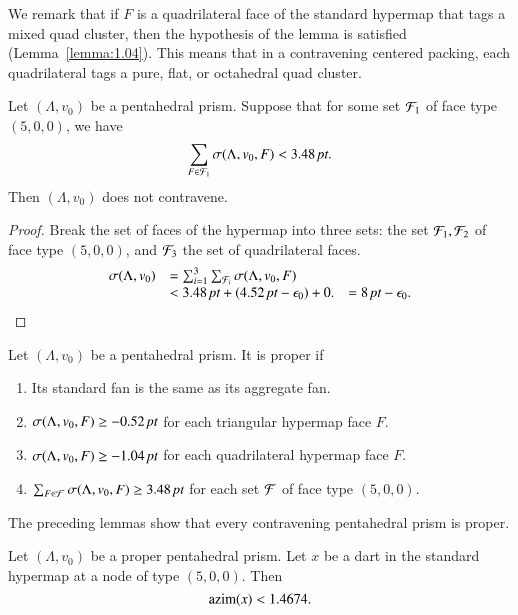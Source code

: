We remark that if $F$ is a quadrilateral face of the standard hypermap
that tags a mixed quad cluster, then the hypothesis of the lemma
is satisfied (Lemma~\ref{lemma:1.04}).  This means that in a contravening
centered packing, each quadrilateral tags a pure, flat, or octahedral
quad cluster.


\begin{lemma}
Let $(\Lambda,v_0)$ be a pentahedral prism.  Suppose that for some 
set ${\mathcal F}_1$ of face type $(5,0,0)$,  we have
  $$
  \sum_{F\in{\mathcal F}_1}\sigma(\Lambda,v_0,F) < 3.48\,\hbox{\it pt}.
  $$
Then $(\Lambda,v_0)$ does not contravene.
\end{lemma}

\begin{proof}
Break the set of faces of the hypermap into three sets:
the set ${\mathcal F}_1,{\mathcal F}_2$ of face type $(5,0,0)$, and ${\mathcal F}_3$ the set
of quadrilateral faces.
  $$
  \begin{array}{llll}
  \sigma(\Lambda,v_0) &= \sum_{i=1}^3\sum_{{\mathcal F}_i}\sigma(\Lambda,v_0,F)\\
    &< 3.48\,\hbox{\it pt} + (4.52\,\hbox{\it pt} - \epsilon_0) + 0.
    &= 8\,\hbox{\it pt} - \epsilon_0.
  \end{array}
  $$
\end{proof}

\begin{definition}
Let $(\Lambda,v_0)$ be a pentahedral prism.
It is proper if 
\begin{enumerate}
  \item  Its standard fan is the same as its aggregate fan.
  \item $\sigma(\Lambda,v_0,F) \ge -0.52\,\hbox{\it pt}$ for each triangular hypermap face $F$.
  \item $\sigma(\Lambda,v_0,F) \ge -1.04\,\hbox{\it pt}$ for each quadrilateral hypermap face $F$.
  \item $\sum_{F\in{\mathcal F}} \sigma(\Lambda,v_0,F) \ge 3.48\,\hbox{\it pt}$ for each set ${\mathcal F}$ of face type $(5,0,0)$.
\end{enumerate}
\end{definition}

The preceding lemmas show that every contravening pentahedral prism is proper.

\begin{lemma}
Let $(\Lambda,v_0)$ be a proper pentahedral prism.  
Let $x$ be a dart in the standard hypermap at a node of type $(5,0,0)$.
Then $${\operatorname{azim}}(x) < 1.4674.$$
\end{lemma}

